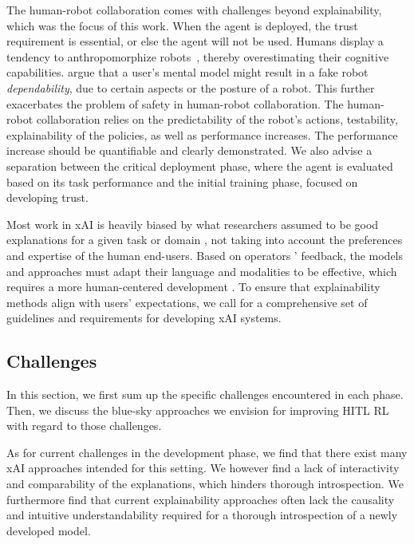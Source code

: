 \documentclass[twoside,11pt]{article}
\newcommand{\sd}[1]{\textcolor{red}{[#1 \textsc{--Srijita}]}}
\begin{document}
\begin{enumerate}
The human-robot collaboration comes with challenges beyond explainability, which was the focus of this work. When the agent is deployed, the trust requirement is essential, or else the agent will not be used. Humans display a tendency to anthropomorphize robots~\citep{damiano2018anthropomorphism}, thereby overestimating their cognitive capabilities. \citet{DeSaintsEtAl:2008:phri} argue that a user's mental model might result in a fake robot \emph{dependability}, due to certain aspects or the posture of a robot. This further exacerbates the problem of safety in human-robot collaboration. The human-robot collaboration relies on the predictability of the robot's actions, testability, explainability of the policies, as well as performance increases. The performance increase should be quantifiable and clearly demonstrated. We also advise a separation between the critical deployment phase, where the agent is evaluated based on its task performance and the initial training phase, focused on developing trust.


Most work in xAI is heavily biased by what researchers assumed to be good explanations for a given task or domain \citep{Miller:2019:xAISocialSciencesInsights}, not taking into account the preferences and expertise of the human end-users. Based on operators ' feedback, the models and approaches must adapt their language and modalities to be effective, which requires a more human-centered development \citep{PuiuttaVeith:2020:xAIRLSurvey}. To ensure that explainability methods align with users' expectations, we call for a comprehensive set of guidelines and requirements for developing xAI systems. 



\subsection{Challenges}
\label{sec:ThirdGeneration}

In this section, we first sum up the specific challenges encountered in each phase. Then, we discuss the blue-sky approaches we envision for improving HITL RL with regard to those challenges.

As for current challenges in the development phase, we find that there exist many xAI approaches intended for this setting. We however find a lack of interactivity and comparability of the explanations, which hinders thorough introspection. We furthermore find that current explainability approaches often lack the causality and intuitive understandability required for a thorough introspection of a newly developed model.


\end{enumerate}
\end{document}
